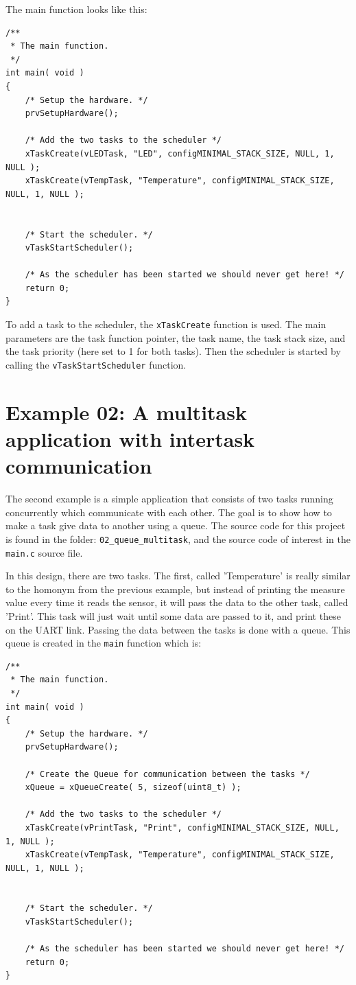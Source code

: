 \documentclass[11pt]{report}
\begin{document}
The main function looks like this:
\begin{verbatim}
/**
 * The main function.
 */
int main( void )
{
    /* Setup the hardware. */
    prvSetupHardware();
    
    /* Add the two tasks to the scheduler */
    xTaskCreate(vLEDTask, "LED", configMINIMAL_STACK_SIZE, NULL, 1, NULL );
    xTaskCreate(vTempTask, "Temperature", configMINIMAL_STACK_SIZE, NULL, 1, NULL );
    
    
    /* Start the scheduler. */
    vTaskStartScheduler();
    
    /* As the scheduler has been started we should never get here! */
    return 0;
}
\end{verbatim}

To add a task to the scheduler, the \verb$xTaskCreate$ function is used. The main parameters are the task function pointer, the task name, the task stack size, and the task priority (here set to 1 for both tasks). Then the scheduler is started by calling the \verb$vTaskStartScheduler$ function.


\section{Example 02: A multitask application with intertask communication}

The second example is a simple application that consists of two tasks running concurrently which communicate with each other. The goal is to show how to make a task give data to another using a queue. The source code for this project is found in the folder: \verb$02_queue_multitask$, and the source code of interest in the \verb$main.c$ source file.

In this design, there are two tasks. The first, called 'Temperature' is really similar to the homonym from the previous example, but instead of printing the measure value every time it reads the sensor, it will pass the data to the other task, called 'Print'. This task will just wait until some data are passed to it, and print these on the UART link. Passing the data between the tasks is done with a queue. This queue is created in the \verb$main$ function which is:
\begin{verbatim}
/**
 * The main function.
 */
int main( void )
{
    /* Setup the hardware. */
    prvSetupHardware();
    
    /* Create the Queue for communication between the tasks */
    xQueue = xQueueCreate( 5, sizeof(uint8_t) );
    
    /* Add the two tasks to the scheduler */
    xTaskCreate(vPrintTask, "Print", configMINIMAL_STACK_SIZE, NULL, 1, NULL );
    xTaskCreate(vTempTask, "Temperature", configMINIMAL_STACK_SIZE, NULL, 1, NULL );
    
    
    /* Start the scheduler. */
    vTaskStartScheduler();
    
    /* As the scheduler has been started we should never get here! */
    return 0;
}
\end{verbatim}
\end{document}
